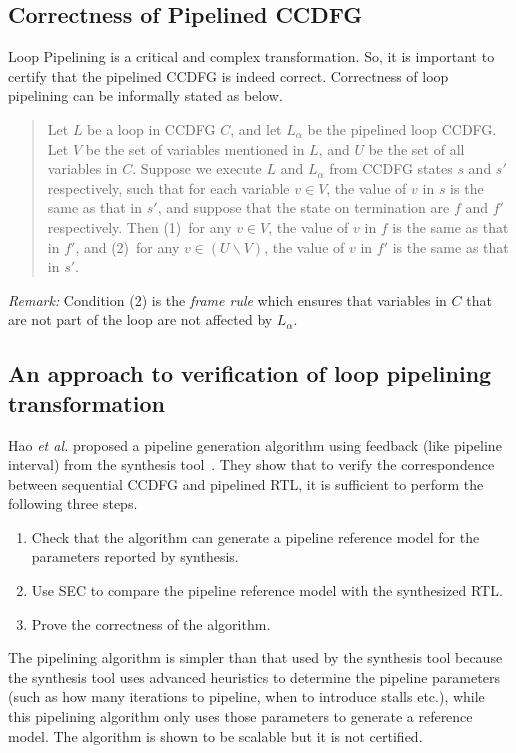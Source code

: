 \subsection{Correctness of Pipelined CCDFG}
\label{subsec:correctness-defn}

Loop Pipelining is a critical and complex transformation. So, it is important to certify that the pipelined CCDFG is indeed correct. Correctness of loop pipelining 
can be informally stated as below.

\begin{quote}
Let $L$ be a loop in CCDFG $C$, and let $L_{\alpha}$ be the
pipelined loop CCDFG. Let $V$ be the set of
variables mentioned in $L$, and $U$ be the set of all
variables in $C$.  Suppose we execute $L$ and $L_{\alpha}$
from CCDFG states $s$ and $s'$ respectively, such that for
each variable $v\in V$, the value of $v$ in $s$ is the same
as that in $s'$, and suppose that the state on termination
are $f$ and $f'$ respectively.  Then (1)~for any $v\in V$,
the value of $v$ in $f$ is the same as that in $f'$, and
(2)~for any $v\in(U\backslash V)$, the value of $v$ in $f'$
is the same as that in $s'$.
\end{quote}
\noindent
{\em Remark:} Condition (2) is the {\em frame rule} which
ensures that variables in $C$ that are not part of the loop
are not affected by $L_{\alpha}$.

\subsection{An approach to verification of loop pipelining transformation}
\label{subsec:hao-approach}

Hao {\em et al.} proposed a pipeline generation algorithm using feedback (like pipeline interval) from the synthesis tool~\cite{hrx:dac-12}. They show that to verify the correspondence between sequential CCDFG and pipelined RTL, it is sufficient to perform the following three steps. 
\begin{enumerate} 
\item Check that the algorithm can generate a pipeline reference model for the parameters reported by synthesis.
\item Use SEC to compare the pipeline reference model with the
synthesized RTL.
\item Prove the correctness of the algorithm. 
\end{enumerate}

The pipelining algorithm is simpler than that used by the synthesis tool because the synthesis tool uses advanced heuristics to determine the pipeline parameters (such as how many iterations to pipeline, when to introduce stalls etc.), while this pipelining algorithm only uses those parameters to generate a reference model. The algorithm is shown to be scalable but it is not certified. 

